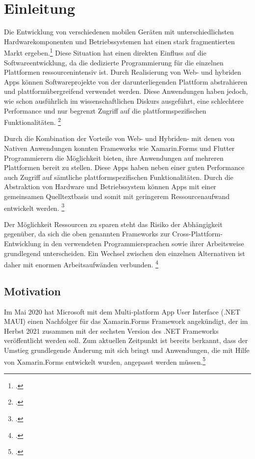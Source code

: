 \chapter{Einleitung}
Die Entwicklung von verschiedenen mobilen Geräten mit unterschiedlichsten Hardwarekomponenten und Betriebssystemen hat einen stark fragmentierten Markt ergeben.\footcite[Vgl.][S. 3]{Joorabchi2016}  Diese Situation hat einen direkten Einfluss auf die Softwareentwicklung, da die dedizierte Programmierung für die einzelnen Plattformen ressourcenintensiv ist.  Durch Realisierung von Web- und hybriden Apps können Softwareprojekte von der darunterliegenden Plattform abstrahieren und plattformübergreifend verwendet werden.  Diese Anwendungen haben jedoch, wie schon ausführlich im wissenschaftlichen Diskurs ausgeführt,  eine schlechtere Performance und nur begrenzt Zugriff auf die plattform\-spezifischen Funktionalitäten.  \footcite[Vgl.][S. 110ff.]{Barton2016} 

Durch die Kombination der Vorteile von Web- und Hybriden- mit denen von Nativen Anwendungen konnten Frameworks wie Xamarin.Forms und Flutter Programmierern die Möglichkeit bieten,  ihre Anwendungen auf mehreren Plattformen bereit zu stellen.  Diese Apps haben neben einer guten Performance auch Zugriff auf sämtliche plattformspezifischen Funktionalitäten.  Durch die Abstraktion von Hardware und Betriebssystem können Apps mit einer gemeinsamen Quelltextbasis und somit mit geringerem Ressourcenaufwand entwickelt werden. \footcite[Vgl.][S. 295]{Vollmer2017} 

Der Möglichkeit Ressourcen zu sparen steht das Risiko der Abhängigkeit gegenüber, da sich die oben genannten Frameworks zur Cross-Plattform-Entwicklung in den verwendeten Programmiersprachen sowie ihrer Arbeitsweise grundlegend unterscheiden.  Ein Wechsel zwischen den einzelnen Alternativen ist daher mit enormen Arbeitsaufwänden verbunden. \footcite[Vgl.][S. 64]{Wissel2017}  

\section{Motivation}
Im Mai 2020 hat Microsoft mit dem Multi-platform App User Interface (.NET MAUI) einen Nachfolger für das Xamarin.Forms Framework angekündigt, der im Herbst 2021 zusammen mit der sechsten Version des .NET Frameworks veröffentlicht werden soll. Zum aktuellen Zeitpunkt ist bereits berkannt, dass der Umstieg grundlegende Änderung mit sich bringt und Anwendungen,  die mit Hilfe von Xamarin.Forms entwickelt wurden,  angepasst werden müssen.\footcite[Vgl.][Abgerufen am 28.10.2020]{Hunter2020}


